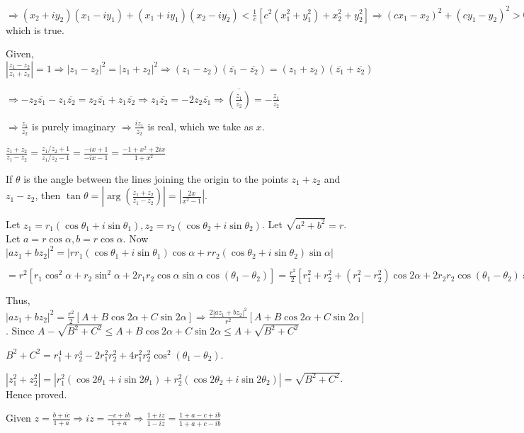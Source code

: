  $\Rightarrow (x_2 + iy_2)(x_1 - iy_1) + (x_1 + iy_1)(x_2 - iy_2) < \frac{1}{c}[c^2(x_1^2 + y_1^2) + x_2^2
    + y_2^2] \Rightarrow (cx_1 - x_2)^2 + (cy_1 - y_2)^2 > 0$ which is true.
\item Given, $\left|\frac{z_1 - z_2}{z_1 + z_2}\right| = 1\Rightarrow |z_1 - z_2|^2 = |z_1 + z_2|^2
  \Rightarrow (z_1 - z_2)(\overline{z_1} - \overline{z_2}) = (z_1 + z_2)(\overline{z_1} + \overline{z_2})$

  $\Rightarrow -z_2\overline{z_1} - z_1\overline{z_2} = z_2\overline{z_1} + z_1\overline{z_2} \Rightarrow
  z_1\overline{z_2} = -2z_2\overline{z_1} \Rightarrow \overline{\left(\frac{z_1}{z_2}\right)} =
  -\frac{z_1}{z_2}$

  $\Rightarrow \frac{z_1}{z_2}$ is purely imaginary $\Rightarrow \frac{iz_1}{z_2}$ is real, which we take as
  $x$.

  $\frac{z_1 + z_2}{z_1 - z_2} = \frac{z_1/z_2 + 1}{z_1/z_2 - 1} = \frac{-ix + 1}{-ix - 1} = \frac{-1 + x^2
    + 2ix}{1 + x^2}$

  If $\theta$ is the angle between the lines joining the origin to the points $z_1 + z_2$ and $z_1 - z_2$,
  then $\tan\theta = \left|\arg\left(\frac{z_1 + z_2}{z_1 - z_2}\right)\right| = \left|\frac{2x}{x^2 -
    1}\right|$.
\item Let $z_1 = r_1(\cos\theta_1 + i\sin\theta_1), z_2= r_2(\cos\theta_2 + i\sin\theta_2)$. Let $\sqrt{a^2
  + b^2} = r$. Let $a = r\cos\alpha, b = r\cos\alpha$. Now $|az_1 + bz_2|^2 = |rr_1(\cos\theta_1 +
  i\sin\theta_1)\cos\alpha + rr_2(\cos\theta_2 + i\sin\theta_2)\sin\alpha|$

  $= r^2[r_1\cos^2\alpha + r_2\sin^2\alpha + 2r_1r_2\cos\alpha\sin\alpha\cos(\theta_1 - \theta_2)] =
  \frac{r^2}{2}[r_1^2 + r_2^2 + (r_1^2 - r_2^2)\cos2\alpha + 2r_2r_2\cos(\theta_1 - \theta_2)\sin2\alpha]$

  Thus, $|az_1 + bz_2|^2 = \frac{r^2}{2}[A + B\cos2\alpha + C\sin2\alpha] \Rightarrow  \frac{2|az_1 +
    bz_2|^2}{r^2}[A + B\cos2\alpha + C\sin2\alpha]$. Since $A - \sqrt{B^2 + C^2} \leq A + B\cos2\alpha +
  C\sin2\alpha \leq A + \sqrt{B^2 + C^2}$

  $B^2 + C^2 = r_1^4 + r_2^4 - 2r_1^2r_2^2 + 4r_1^2r_2^2\cos^2(\theta_1 - \theta_2)$.

  $|z_1^2 + z_2^2| = |r_1^2(\cos2\theta_1 + i\sin2\theta_1) + r_2^2(\cos2\theta_2 + i\sin2\theta_2)| =
  \sqrt{B^2 + C^2}$. Hence proved.
\item Given $z = \frac{b + ic}{1 + a} \Rightarrow iz = \frac{-c + ib}{1 + a} \Rightarrow \frac{1 + iz}{1 -
  iz} = \frac{1 + a - c + ib}{1 + a + c - ib}$


